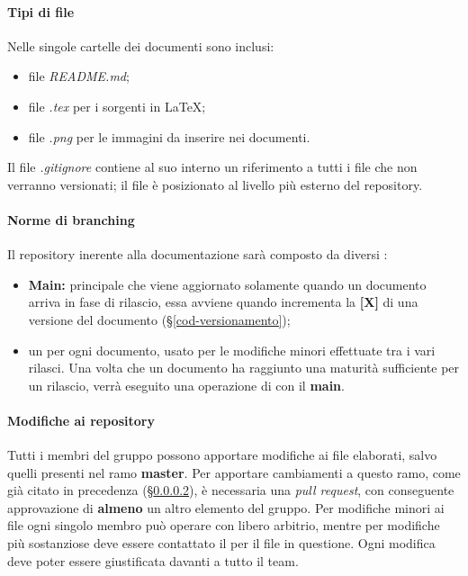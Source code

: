 \paragraph{Tipi di file}
Nelle singole cartelle dei documenti sono inclusi:
\begin{itemize}
\item file \textit{README.md};
\item file \textit{.tex} per i sorgenti in \LaTeX; 
\item file \textit{.png} per le immagini da inserire nei documenti.
\end{itemize}
Il file \textit{.gitignore} contiene al suo interno un riferimento a tutti i file che non verranno versionati; il file è posizionato al livello più esterno del repository.
\paragraph{Norme di branching}
\label{NormeBranching}
Il repository inerente alla documentazione sarà composto da diversi :
\begin{itemize}
	\item \textbf{Main:}  principale che viene aggiornato solamente quando un documento arriva in fase di rilascio, essa avviene quando incrementa la \textbf{[X]} di una versione del documento (\S{}\ref{cod-versionamento});
	\item un  per ogni documento, usato per le modifiche minori effettuate tra i vari rilasci. Una volta che un documento ha raggiunto una maturità sufficiente per un rilascio, verrà eseguito una operazione di  con il \textbf{main}.
\end{itemize}
\paragraph{Modifiche ai repository}
Tutti i membri del gruppo possono apportare modifiche ai file elaborati, salvo quelli presenti nel ramo \textbf{master}. Per apportare cambiamenti a questo ramo, come già citato in precedenza (\S{}\ref{NormeBranching}), è necessaria una \textit{pull request}, con conseguente approvazione di \textbf{almeno} un altro elemento del gruppo.\newline
Per modifiche minori ai file ogni singolo membro può operare con libero arbitrio, mentre per modifiche più sostanziose deve essere contattato il \RdP{} per il file in questione.\newline
Ogni modifica deve poter essere giustificata davanti a tutto il team.
